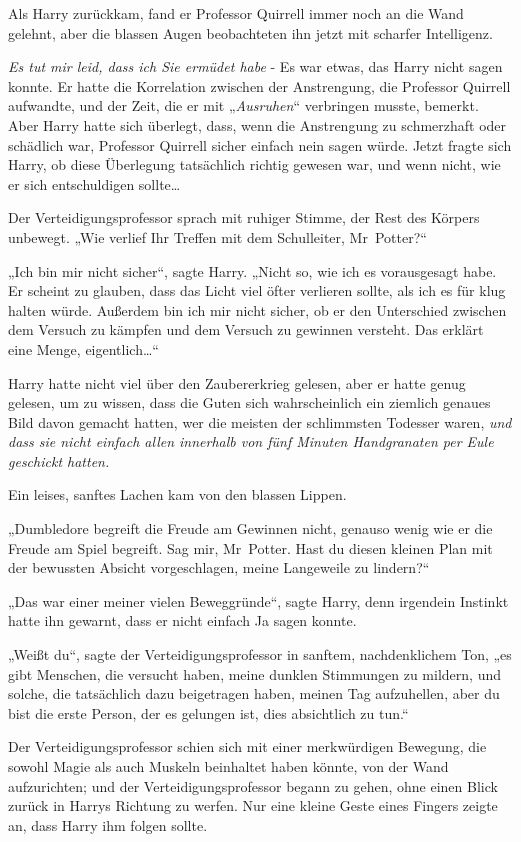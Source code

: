 {Als Harry zurückkam, fand er Professor Quirrell immer noch an die Wand gelehnt, aber die blassen Augen beobachteten ihn jetzt mit scharfer Intelligenz.

\emph{Es tut mir leid, dass ich Sie ermüdet habe} - Es war etwas, das Harry nicht sagen konnte. Er hatte die Korrelation zwischen der Anstrengung, die Professor Quirrell aufwandte, und der Zeit, die er mit „\emph{Ausruhen}“ verbringen musste, bemerkt. Aber Harry hatte sich überlegt, dass, wenn die Anstrengung zu schmerzhaft oder schädlich war, Professor Quirrell sicher einfach nein sagen würde. Jetzt fragte sich Harry, ob diese Überlegung tatsächlich richtig gewesen war, und wenn nicht, wie er sich entschuldigen sollte…

Der Verteidigungsprofessor sprach mit ruhiger Stimme, der Rest des Körpers unbewegt. „Wie verlief Ihr Treffen mit dem Schulleiter, Mr~Potter?“

„Ich bin mir nicht sicher“, sagte Harry. „Nicht so, wie ich es vorausgesagt habe. Er scheint zu glauben, dass das Licht viel öfter verlieren sollte, als ich es für klug halten würde. Außerdem bin ich mir nicht sicher, ob er den Unterschied zwischen dem Versuch zu kämpfen und dem Versuch zu gewinnen versteht. Das erklärt eine Menge, eigentlich…“

Harry hatte nicht viel über den Zaubererkrieg gelesen, aber er hatte genug gelesen, um zu wissen, dass die Guten sich wahrscheinlich ein ziemlich genaues Bild davon gemacht hatten, wer die meisten der schlimmsten Todesser waren, \emph{und dass sie nicht einfach allen innerhalb von fünf Minuten Handgranaten per Eule geschickt hatten.}

Ein leises, sanftes Lachen kam von den blassen Lippen.

„Dumbledore begreift die Freude am Gewinnen nicht, genauso wenig wie er die Freude am Spiel begreift. Sag mir, Mr~Potter. Hast du diesen kleinen Plan mit der bewussten Absicht vorgeschlagen, meine Langeweile zu lindern?“

„Das war einer meiner vielen Beweggründe“, sagte Harry, denn irgendein Instinkt hatte ihn gewarnt, dass er nicht einfach Ja sagen konnte.

„Weißt du“, sagte der Verteidigungsprofessor in sanftem, nachdenklichem Ton, „es gibt Menschen, die versucht haben, meine dunklen Stimmungen zu mildern, und solche, die tatsächlich dazu beigetragen haben, meinen Tag aufzuhellen, aber du bist die erste Person, der es gelungen ist, dies absichtlich zu tun.“

Der Verteidigungsprofessor schien sich mit einer merkwürdigen Bewegung, die sowohl Magie als auch Muskeln beinhaltet haben könnte, von der Wand aufzurichten; und der Verteidigungsprofessor begann zu gehen, ohne einen Blick zurück in Harrys Richtung zu werfen. Nur eine kleine Geste eines Fingers zeigte an, dass Harry ihm folgen sollte.

}
